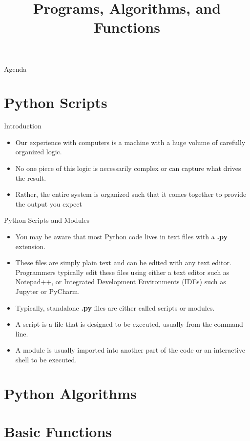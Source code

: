 \documentclass[../main.tex]{subfiles}
\title{Programs, Algorithms, and Functions}
\begin{document}
\begin{frame}
  \maketitle
\end{frame}
\begin{frame}{Agenda}
  \tableofcontents
\end{frame}

\section{Python Scripts}
\label{sec:introduction}

\begin{frame}{Introduction}
  \begin{itemize} \parskip3mm \justifying
  \item   Our experience with computers is a machine with a huge volume of carefully organized
    logic.
\item No one piece of this logic is necessarily complex or can capture what drives the
result. 
\item Rather, the entire system is organized such that it comes together to provide the
output you expect
  \end{itemize}
\end{frame}

\begin{frame}{Python Scripts and Modules}
  \begin{itemize} \parskip3mm \justifying
  \item You may be aware that most Python code lives in text files with a \textbf{.py} extension. 
  \item These files are simply plain text and can be edited with any text editor. Programmers typically edit these files using either a text editor such
as Notepad++, or Integrated Development Environments (IDEs) such as Jupyter or PyCharm.
\item Typically, standalone \textbf{.py} files are either called \alert{scripts} or \alert{modules}. 
\item A script is a file that is designed to be executed, usually from the command line. 
\item A  module is usually imported into another part of the code or an interactive shell to be executed. 
  \end{itemize}
\end{frame}

\section{Python Algorithms}
\label{sec:algorithms}


\section{Basic Functions}
\label{sec:functions}



\end{document}
